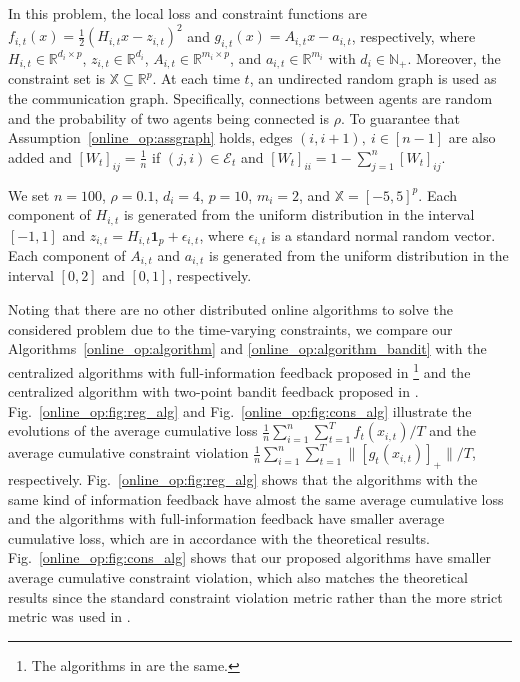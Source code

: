 \documentclass[12pt,draftcls,onecolumn]{IEEEtran}%
\begin{document}
In this problem, the local loss and constraint functions are $f_{i,t}(x)=\frac{1}{2}(H_{i,t}x-z_{i,t})^2$ and $g_{i,t}(x)=A_{i,t}x-a_{i,t}$, respectively, where $H_{i,t}\in\mathbb{R}^{d_i\times p}$, $z_{i,t}\in\mathbb{R}^{d_i}$, $A_{i,t}\in\mathbb{R}^{m_i\times p}$, and $a_{i,t}\in\mathbb{R}^{m_i}$ with $d_i\in\mathbb{N}_+$. Moreover, the constraint set is $\mathbb{X}\subseteq\mathbb{R}^{p}$. At each time $t$, an undirected random graph is used as the communication graph. Specifically, connections between agents are random and the probability of two agents being connected is $\rho$. To guarantee that Assumption~\ref{online_op:assgraph} holds, edges $(i,i+1),~i\in[n-1]$ are also added and $[W_t]_{ij}=\frac{1}{n}$ if $(j,i)\in\mathcal{E}_t$ and $[W_t]_{ii}=1-\sum_{j=1}^n[W_t]_{ij}$.


We set $n=100$, $\rho=0.1$, $d_i=4$, $p=10$, $m_i=2$, and $\mathbb{X}=[-5,5]^p$. Each component of $H_{i,t}$ is generated from the uniform distribution in the interval $[-1,1]$ and $z_{i,t}=H_{i,t}\bm{1}_p+\epsilon_{i,t}$, where $\epsilon_{i,t}$ is a standard normal random vector. Each component of $A_{i,t}$ and $a_{i,t}$ is generated from the uniform distribution in the interval $[0,2]$ and $[0,1]$, respectively.

Noting that there are no other distributed online algorithms to solve the considered problem due to the time-varying constraints, we compare our Algorithms~\ref{online_op:algorithm} and \ref{online_op:algorithm_bandit} with the centralized algorithms with full-information feedback proposed in \cite{sun2017safety,yu2017online,neely2017online}\footnote{The algorithms in \cite{yu2017online,neely2017online} are the same.} and  the centralized algorithm with two-point bandit feedback proposed in \cite{cao2019online}. Fig.~\ref{online_op:fig:reg_alg} and Fig.~\ref{online_op:fig:cons_alg} illustrate the evolutions of the average cumulative loss $\frac{1}{n}\sum_{i=1}^{n}\sum_{t=1}^{T}f_t(x_{i,t})/T$ and the average cumulative constraint violation $\frac{1}{n}\sum_{i=1}^n\sum_{t=1}^T\|[g_{t}(x_{i,t})]_+\|/T$, respectively. Fig.~\ref{online_op:fig:reg_alg} shows that the algorithms with the same kind of information feedback have almost the same average cumulative loss and the algorithms with full-information feedback have smaller average cumulative loss, which are in accordance with the theoretical results. Fig.~\ref{online_op:fig:cons_alg} shows that our proposed algorithms have  smaller average cumulative constraint violation, which also matches the theoretical results since the standard constraint violation metric rather than the more strict metric was used in \cite{sun2017safety,yu2017online,neely2017online,cao2019online}.
\end{document}
